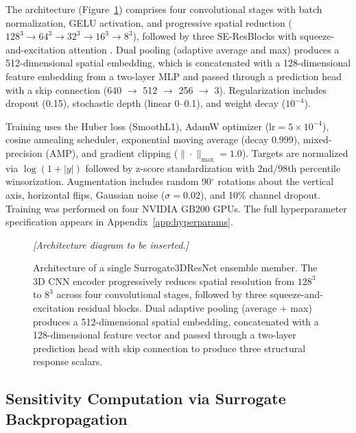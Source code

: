\documentclass[11pt]{article}
\theoremstyle{plain}
\theoremstyle{definition}
\theoremstyle{remark}
\begin{document}
The architecture (Figure~\ref{fig:architecture}) comprises four convolutional stages with batch normalization, GELU activation, and progressive spatial reduction ($128^3 \to 64^3 \to 32^3 \to 16^3 \to 8^3$), followed by three SE-ResBlocks with squeeze-and-excitation attention \cite{hu2018}. Dual pooling (adaptive average and max) produces a 512-dimensional spatial embedding, which is concatenated with a 128-dimensional feature embedding from a two-layer MLP and passed through a prediction head with a skip connection (640 $\to$ 512 $\to$ 256 $\to$ 3). Regularization includes dropout (0.15), stochastic depth (linear 0--0.1), and weight decay ($10^{-4}$).

Training uses the Huber loss (SmoothL1), AdamW optimizer ($\text{lr} = 5\times10^{-4}$), cosine annealing scheduler, exponential moving average (decay 0.999), mixed-precision (AMP), and gradient clipping ($\|\cdot\|_{\max} = 1.0$). Targets are normalized via $\log(1+|y|)$ followed by z-score standardization with 2nd/98th percentile winsorization. Augmentation includes random 90$^\circ$ rotations about the vertical axis, horizontal flips, Gaussian noise ($\sigma = 0.02$), and 10\% channel dropout. Training was performed on four NVIDIA GB200 GPUs. The full hyperparameter specification appears in Appendix~\ref{app:hyperparams}.

\begin{figure}[t]
\centering
\textit{[Architecture diagram to be inserted.]}
\caption{Architecture of a single Surrogate3DResNet ensemble member. The 3D CNN encoder progressively reduces spatial resolution from $128^3$ to $8^3$ across four convolutional stages, followed by three squeeze-and-excitation residual blocks. Dual adaptive pooling (average + max) produces a 512-dimensional spatial embedding, concatenated with a 128-dimensional feature vector and passed through a two-layer prediction head with skip connection to produce three structural response scalars.}
\label{fig:architecture}
\end{figure}

\subsection{Sensitivity Computation via Surrogate Backpropagation}
\label{sec:sensitivity}
\end{document}

